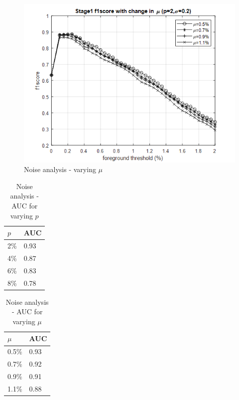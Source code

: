 \begin{figure}
    \centering
    \includegraphics[width=\linewidth]{images/noise-analysis-mog-mu.png}
    \caption{Noise analysis - varying $\mu$}
    \label{fig:noise-analysis-mog-mu}
\end{figure}

\begin{table}
\centering
\label{table:noise-analysis-auc-mog-p}
\caption{Noise analysis - AUC for varying $p$} \vspace{5pt}
\begin{tabular}{|l|l|}
\hline
$p$         & AUC  \\ \hline \hline
2\%         & 0.93   \\
4\%         & 0.87    \\ 
6\%         & 0.83      \\ 
8\%         & 0.78       \\ \hline
\end{tabular}
\end{table}

\begin{table}
\centering
\label{table:noise-analysis-auc-mog-mu}
\caption{Noise analysis - AUC for varying $\mu$} \vspace{5pt}
\begin{tabular}{|l|l|}
\hline
$\mu$         & AUC  \\ \hline \hline
0.5\%         & 0.93   \\
0.7\%         & 0.92    \\ 
0.9\%         & 0.91      \\ 
1.1\%         & 0.88       \\ \hline
\end{tabular}
\end{table}



\newpage